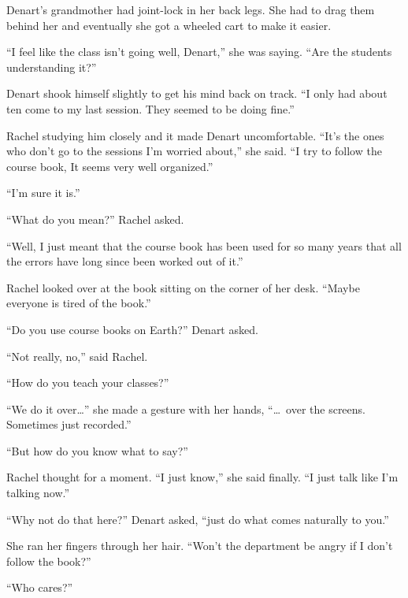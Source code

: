 Denart's grandmother had joint-lock in her back legs. She had to drag them behind her and
eventually she got a wheeled cart to make it easier.

``I feel like the class isn't going well, Denart,'' she was saying. ``Are the students
understanding it?''

Denart shook himself slightly to get his mind back on track. ``I only had about ten come to my
last session. They seemed to be doing fine.''

Rachel studying him closely and it made Denart uncomfortable. ``It's the ones who don't go to
the sessions I'm worried about,'' she said. ``I try to follow the course book, It seems very
well organized.''

``I'm sure it is.''

``What do you mean?'' Rachel asked.

``Well, I just meant that the course book has been used for so many years that all the errors
have long since been worked out of it.''

Rachel looked over at the book sitting on the corner of her desk. ``Maybe everyone is tired of
the book.''

``Do you use course books on Earth?'' Denart asked.

``Not really, no,'' said Rachel.

``How do you teach your classes?''

``We do it over\ldots'' she made a gesture with her hands, ``\ldots\ over the screens. Sometimes
just recorded.''

``But how do you know what to say?''

Rachel thought for a moment. ``I just know,'' she said finally. ``I just talk like I'm talking
now.''

``Why not do that here?'' Denart asked, ``just do what comes naturally to you.''

She ran her fingers through her hair. ``Won't the department be angry if I don't follow the
book?''

``Who cares?''

